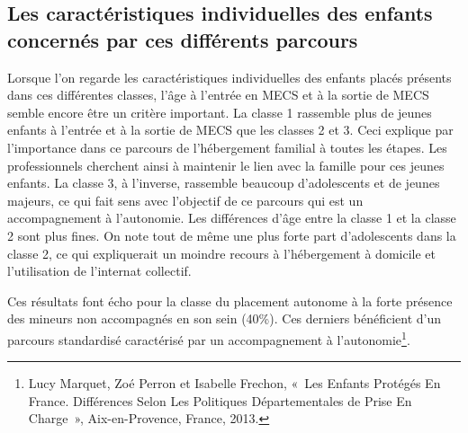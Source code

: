 \documentclass[
  12,
  a4paper,
]{report}
\begin{document}
\hypertarget{les-caractuxe9ristiques-individuelles-des-enfants-concernuxe9s-par-ces-diffuxe9rents-parcours}{%
\subsection{Les caractéristiques individuelles des enfants concernés par
ces différents
parcours}\label{les-caractuxe9ristiques-individuelles-des-enfants-concernuxe9s-par-ces-diffuxe9rents-parcours}}

Lorsque l'on regarde les caractéristiques individuelles des enfants
placés présents dans ces différentes classes, l'âge à l'entrée en MECS
et à la sortie de MECS semble encore être un critère important. La
classe 1 rassemble plus de jeunes enfants à l'entrée et à la sortie de
MECS que les classes 2 et 3. Ceci explique par l'importance dans ce
parcours de l'hébergement familial à toutes les étapes. Les
professionnels cherchent ainsi à maintenir le lien avec la famille pour
ces jeunes enfants. La classe 3, à l'inverse, rassemble beaucoup
d'adolescents et de jeunes majeurs, ce qui fait sens avec l'objectif de
ce parcours qui est un accompagnement à l'autonomie. Les différences
d'âge entre la classe 1 et la classe 2 sont plus fines. On note tout de
même une plus forte part d'adolescents dans la classe 2, ce qui
expliquerait un moindre recours à l'hébergement à domicile et
l'utilisation de l'internat collectif.

Ces résultats font écho pour la classe du placement autonome à la forte
présence des mineurs non accompagnés en son sein (40\%). Ces derniers
bénéficient d'un parcours standardisé caractérisé par un accompagnement
à l'autonomie\footnote{Lucy Marquet, Zoé Perron et Isabelle Frechon,
  {«~Les Enfants Protégés En {France}. {Différences} Selon Les
  Politiques Départementales de Prise En Charge~»}, {Aix-en-Provence,
  France}, 2013.}.
\end{document}
